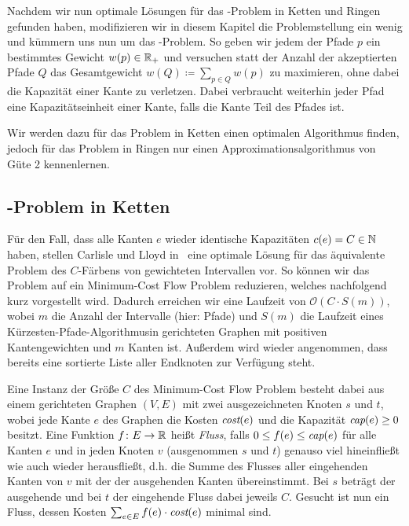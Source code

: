 Nachdem wir nun optimale Lösungen für das \CallControl-Problem in Ketten und Ringen gefunden haben, modifizieren
wir in diesem Kapitel die Problemstellung ein wenig und kümmern uns nun um das \WeightedCallControl-Problem.
So geben wir jedem der Pfade $p$ ein bestimmtes Gewicht $w(p) \in \mathbb R_+$ und versuchen statt der
Anzahl der akzeptierten Pfade $Q$ das Gesamtgewicht $w(Q) \coloneqq \sum_{p\in Q}w(p)$ zu maximieren, ohne
dabei die Kapazität einer Kante zu verletzen.
Dabei verbraucht weiterhin jeder Pfad eine Kapazitätseinheit einer Kante, falls die Kante Teil des Pfades ist.

Wir werden dazu für das Problem in Ketten einen optimalen Algorithmus finden, jedoch für das Problem in Ringen
nur einen Approximationsalgorithmus von Güte 2 kennenlernen.

\subsection{\WeightedCallControl-Problem in Ketten}\label{subsec:weighted-call-control-in-chains}
Für den Fall, dass alle Kanten $e$ wieder identische Kapazitäten $c(e) = C \in \mathbb N$ haben, stellen Carlisle und Lloyd
in~\cite{carlisle} eine optimale Lösung für das äquivalente Problem des $C$-Färbens von gewichteten Intervallen vor.
So können wir das Problem auf ein Minimum-Cost Flow Problem reduzieren, welches nachfolgend kurz vorgestellt wird.
Dadurch erreichen wir eine Laufzeit von $\mathcal O(C\cdot S(m))$, wobei $m$ die Anzahl der Intervalle (hier: Pfade)
und $S(m)$ die Laufzeit eines Kürzesten-Pfade-Algorithmusin gerichteten Graphen mit positiven Kantengewichten und $m$ Kanten ist.
Außerdem wird wieder angenommen, dass bereits eine sortierte Liste aller Endknoten zur Verfügung steht.

Eine Instanz der Größe $C$ des Minimum-Cost Flow Problem besteht dabei aus einem gerichteten Graphen $(V,E)$ mit zwei
ausgezeichneten Knoten $s$ und $t$, wobei jede Kante $e$ des Graphen die Kosten $\text{\em cost}(e)$ und die Kapazität
$\text{\em cap}(e) \geq 0$ besitzt.
Eine Funktion $f\colon E \rightarrow \mathbb R$ heißt {\em Fluss}, falls $0 \leq f(e) \leq \text{\em cap}(e)$ für alle
Kanten $e$ und in jeden Knoten $v$ (ausgenommen $s$ und $t$) genauso viel hineinfließt wie auch wieder herausfließt, d.h.
die Summe des Flusses aller eingehenden Kanten von $v$ mit der der ausgehenden Kanten übereinstimmt.
Bei $s$ beträgt der ausgehende und bei $t$ der eingehende Fluss dabei jeweils $C$.
Gesucht ist nun ein Fluss, dessen Kosten $\sum_{e\in E}f(e) \cdot \text{\em cost}(e)$ minimal sind.

